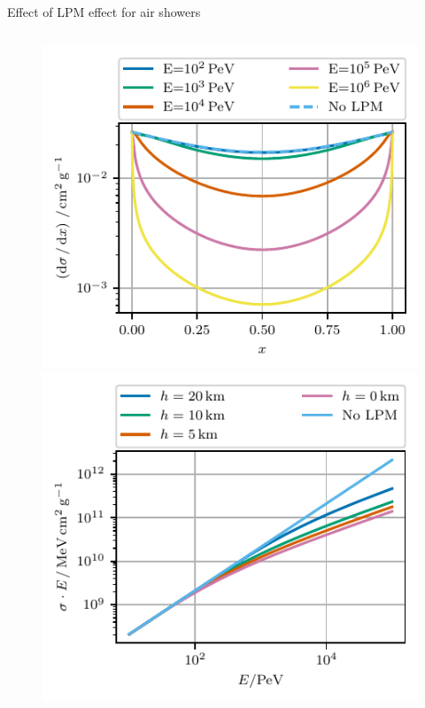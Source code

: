\documentclass[t]{beamer}
\begin{document}
\begin{columns}[onlytextwidth]
\begin{column}{0.6\textwidth}
\begin{block}[equal height group=PLOTS]{Effect of LPM effect for air showers}
\begin{columns}[onlytextwidth]
\begin{column}{0.65\textwidth}
\begin{figure}
\begin{minipage}[t]{0.49\textwidth}
                \includegraphics[width=\linewidth, keepaspectratio]{../plots/lpm_photopair_differential_small.pdf}
              \end{minipage}%
              \hfill
              \begin{minipage}[t]{0.49\textwidth}
                \includegraphics[width=\linewidth, keepaspectratio]{../plots/lpm_cross_photopair_small.pdf}
              \end{minipage}
              \end{figure}

\end{column}
\end{columns}
\end{block}
\end{column}
\end{columns}
\end{document}
